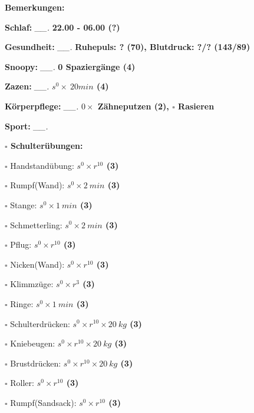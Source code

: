 \documentclass[10pt,a4paper]{article}
\newcommand\prop[1] {{\color {alizarin} {\bf #1}}}             %
\newcommand\mand[1] {{\color {burntorange} {\bf #1}}}          %
\newcommand\topspace{\vskip -15pt \hskip 20pt}
\newcommand\n[1] { {\sl #1.} \hskip 5pt }
\begin{document}
\begin{mdframed}[style=daystyle]
  \begin{labeling}{{\mand {Bemerkungen:}}}
    \setlength\itemsep{-3pt}
  \item[{\mand {Schlaf:}}]       \n{\_\_} {\prop {22.00 - 06.00 (?)}}
  \item[{\mand {Gesundheit:}}]   \n{\_\_} {\prop {Ruhepuls: ? (70), Blutdruck: ?/? (143/89)}}
  \item[{\mand {Snoopy:}}]       \n{\_\_} {\prop {0 Spaziergänge (4)}}    
  \item[{\mand {Zazen:}}]        \n{\_\_} {\prop {$s^0 \times\ 20 min$ (4)}}
  \item[{\mand {Körperpflege:}}] \n{\_\_} {\prop {$0 \times$ Zähneputzen (2), $\square$ Rasieren}}
  \item[{\mand {Sport:}}]        \n{\_\_}
    \topspace
    \begin{minipage}{0.75\textwidth}  
      \begin{labeling}{\prop {$\square$ {Schulterübungen:}}} 
        \setlength\itemsep{-3pt}
      \item[$\square$ Handstandübung:]  {\prop {$s^0 \times r^{10}$ (3)}}
      \item[$\square$ Rumpf(Wand):]     {\prop {$s^0 \times 2\ min$ (3)}}
      \item[$\square$ Stange:]          {\prop {$s^0 \times 1\ min$ (3)}}
      \item[$\square$ Schmetterling:]   {\prop {$s^0 \times 2\ min$ (3)}}
      \item[$\square$ Pflug:]           {\prop {$s^0 \times r^{10}$ (3)}}
      \item[$\square$ Nicken(Wand):]    {\prop {$s^0 \times r^{10}$ (3)}}
      \item[$\square$ Klimmzüge:]       {\prop {$s^0 \times r^3$ (3)}}
      \item[$\square$ Ringe:]           {\prop {$s^0 \times 1\ min$ (3)}}
      \item[$\square$ Schulterdrücken:] {\prop {$s^0 \times r^{10} \times 20\ kg$ (3)}}
      \item[$\square$ Kniebeugen:]      {\prop {$s^0 \times r^{10} \times 20\ kg$ (3)}}
      \item[$\square$ Brustdrücken:]    {\prop {$s^0 \times r^{10} \times 20\ kg$ (3)}}
      \item[$\square$ Roller:]          {\prop {$s^0 \times r^{10}$ (3)}}
      \item[$\square$ Rumpf(Sandsack):] {\prop {$s^0 \times r^{10}$ (3)}}

\end{labeling}
\end{minipage}
\end{labeling}
\end{mdframed}
\end{document}

